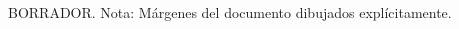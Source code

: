 \begin{titlepage}
    \vspace*{\fill}
    \begin{center}
        {\crest} \\[1.3cm]
        {\Large \gradua}\\
        {\espezialitatea}\\[1.5cm]

        {\large {\gapizenburua}}\\[0.2cm]
        \HRule \\[0.5cm]

        {
        \LARGE
        \begin{spacing}{0.5}
        \textbf{\izenburua}
        \end{spacing}
        }
        \vspace{0.5cm}
        \HRule \\[2.0cm]

        { \egileatestua \\}
        {\Large \textsl{\egilea}\\}
        \vspace{1.0cm}

        {\large \textsf{\urtea}}
        \begin{tcolorbox}[breakable]
            BORRADOR. Nota: Márgenes del documento dibujados explícitamente.
        \end{tcolorbox}
    \end{center}
    \vspace*{\fill}
\end{titlepage}

\cleardoublepage

